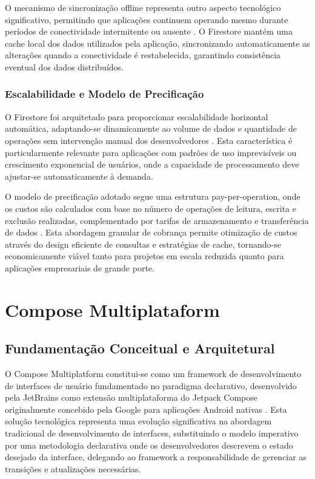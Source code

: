 O mecanismo de sincronização offline representa outro aspecto tecnológico significativo, permitindo que aplicações continuem operando mesmo durante períodos de conectividade intermitente ou ausente \cite{terry2013replicated}. O Firestore mantém uma cache local dos dados utilizados pela aplicação, sincronizando automaticamente as alterações quando a conectividade é restabelecida, garantindo consistência eventual dos dados distribuídos.

\subsubsection{Escalabilidade e Modelo de Precificação}

O Firestore foi arquitetado para proporcionar escalabilidade horizontal automática, adaptando-se dinamicamente ao volume de dados e quantidade de operações sem intervenção manual dos desenvolvedores \cite{google2023scalability}. Esta característica é particularmente relevante para aplicações com padrões de uso imprevisíveis ou crescimento exponencial de usuários, onde a capacidade de processamento deve ajustar-se automaticamente à demanda.

O modelo de precificação adotado segue uma estrutura pay-per-operation, onde os custos são calculados com base no número de operações de leitura, escrita e exclusão realizadas, complementado por tarifas de armazenamento e transferência de dados \cite{firebase2023pricing}. Esta abordagem granular de cobrança permite otimização de custos através do design eficiente de consultas e estratégias de cache, tornando-se economicamente viável tanto para projetos em escala reduzida quanto para aplicações empresariais de grande porte.


\section{Compose Multiplataform}
\subsection{Fundamentação Conceitual e Arquitetural}

O Compose Multiplatform constitui-se como um framework de desenvolvimento de interfaces de usuário fundamentado no paradigma declarativo, desenvolvido pela JetBrains como extensão multiplataforma do Jetpack Compose originalmente concebido pela Google para aplicações Android nativas \cite{jetbrains2023compose}. Esta solução tecnológica representa uma evolução significativa na abordagem tradicional de desenvolvimento de interfaces, substituindo o modelo imperativo por uma metodologia declarativa onde os desenvolvedores descrevem o estado desejado da interface, delegando ao framework a responsabilidade de gerenciar as transições e atualizações necessárias.

